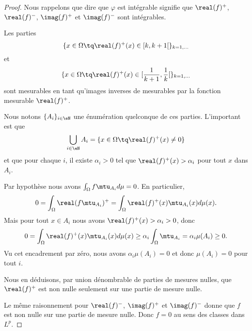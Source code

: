 \begin{proof}
    Nous rappelons que dire que \( \varphi\) est intégrable signifie que \( \real(f)^+\), \( \real(f)^-\), \( \imag(f)^+\) et \( \imag(f)^-\) sont intégrables.

    Les parties
    \begin{equation}
        \{ x\in \Omega \tq \real(f)^+(x)\in \mathopen[ k , k+1 \mathclose[ \}_{k=1,\ldots}
    \end{equation}
    et
    \begin{equation}
        \{ x\in \Omega \tq \real(f)^+(x)\in \mathopen[ \frac{1}{ k+1 } , \frac{1}{ k } \mathclose[ \}_{k=1,\ldots}
    \end{equation}
    sont mesurables en tant qu'images inverses de mesurables par la fonction mesurable \( \real(f)^+\).

    Nous notons \( \{ A_i \}_{i\in \eN}\) une énumération quelconque de ces parties. L'important est que
    \begin{equation}
        \bigcup_{i\in \eN}A_i=\{ x\in \Omega\tq \real(f)^+(x)\neq 0 \}
    \end{equation}
    et que pour chaque \( i\), il existe \( \alpha_i>0\) tel que \( \real(f)^+(x)>\alpha_i\) pour tout \( x\) dans \( A_i\).

    Par hypothèse nous avons \( \int_{\Omega}f\mtu_{A_i}d\mu=0\). En particulier,
    \begin{equation}
        0=\int_{\Omega}\real(f\mtu_{A_i})^+=\int_{\Omega}\real(f)^+(x)\mtu_{A_i}(x)d\mu(x).
    \end{equation}
    Mais pour tout \( x\in A_i\) nous avons \( \real(f)^+(x)>\alpha_i>0\), donc
    \begin{equation}
        0=\int_{\Omega}\real(f)^+(x)\mtu_{A_i}(x)d\mu(x)\geq \alpha_i\int_{\Omega}\mtu_{A_i}=\alpha_i\mu(A_i)\geq 0.
    \end{equation}
    Vu cet encadrement par zéro, nous avons \( \alpha_i\mu(A_i)=0\) et donc \( \mu(A_i)=0\) pour tout \( i\).

    Nous en déduisons, par union dénombrable de parties de mesures nulles, que \( \real(f)^+\) est non nulle seulement sur une partie de mesure nulle.

    Le même raisonnement pour \( \real(f)^-\), \( \imag(f)^+\) et \( \imag(f)^-\) donne que \( f\) est non nulle sur une partie de mesure nulle. Donc \( f=0\) au sens des classes dans \( L^p\).
\end{proof}

